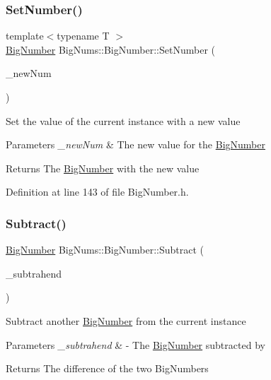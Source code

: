 \subsubsection{\texorpdfstring{SetNumber()}{SetNumber()}}
{\footnotesize\ttfamily template$<$typename T $>$ \\
\mbox{\hyperlink{class_big_nums_1_1_big_number}{Big\+Number}} Big\+Nums\+::\+Big\+Number\+::\+Set\+Number (\begin{DoxyParamCaption}\item[{const T \&}]{\+\_\+new\+Num }\end{DoxyParamCaption})\hspace{0.3cm}{\ttfamily [inline]}}

Set the value of the current instance with a new value 
\begin{DoxyParams}{Parameters}
{\em \+\_\+new\+Num} & The new value for the \mbox{\hyperlink{class_big_nums_1_1_big_number}{Big\+Number}} \\
\hline
\end{DoxyParams}
\begin{DoxyReturn}{Returns}
The \mbox{\hyperlink{class_big_nums_1_1_big_number}{Big\+Number}} with the new value 
\end{DoxyReturn}


Definition at line 143 of file Big\+Number.\+h.

\mbox{\label{class_big_nums_1_1_big_number_a505eed1769193372c05a1c41ae0e707b}} 
\subsubsection{\texorpdfstring{Subtract()}{Subtract()}}
{\footnotesize\ttfamily \mbox{\hyperlink{class_big_nums_1_1_big_number}{Big\+Number}} Big\+Nums\+::\+Big\+Number\+::\+Subtract (\begin{DoxyParamCaption}\item[{const \mbox{\hyperlink{class_big_nums_1_1_big_number}{Big\+Number}} \&}]{\+\_\+subtrahend }\end{DoxyParamCaption})}

Subtract another \mbox{\hyperlink{class_big_nums_1_1_big_number}{Big\+Number}} from the current instance 
\begin{DoxyParams}{Parameters}
{\em \+\_\+subtrahend} & -\/ The \mbox{\hyperlink{class_big_nums_1_1_big_number}{Big\+Number}} subtracted by \\
\hline
\end{DoxyParams}
\begin{DoxyReturn}{Returns}
The difference of the two Big\+Numbers 
\end{DoxyReturn}


